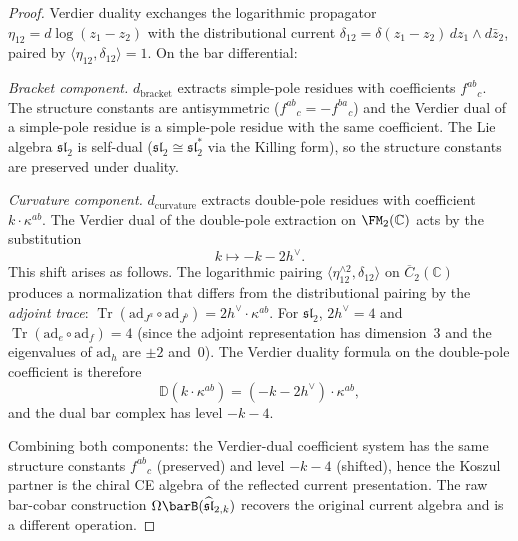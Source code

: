 \begin{proof}
Verdier duality exchanges the logarithmic propagator
$\eta_{12} = d\log(z_1 - z_2)$ with the distributional current
$\delta_{12} = \delta(z_1 - z_2)\, dz_1 \wedge d\bar{z}_2$, paired
by $\langle \eta_{12}, \delta_{12} \rangle = 1$. On the bar
differential:

\emph{Bracket component.}
$d_{\mathrm{bracket}}$ extracts simple-pole residues with
coefficients $f^{ab}{}_c$. The structure constants are antisymmetric
($f^{ab}{}_c = -f^{ba}{}_c$) and the Verdier dual of a simple-pole
residue is a simple-pole residue with the same coefficient. The Lie
algebra $\mathfrak{sl}_2$ is self-dual
($\mathfrak{sl}_2 \cong \mathfrak{sl}_2^*$ via the Killing form),
so the structure constants are preserved under duality.

\emph{Curvature component.}
$d_{\mathrm{curvature}}$ extracts double-pole residues with
coefficient $k \cdot \kappa^{ab}$. The Verdier dual of the
double-pole extraction on $\FM_2(\mathbb{C})$ acts by the
substitution
\[
k \longmapsto -k - 2h^\vee.
\]
This shift arises as follows. The logarithmic pairing
$\langle \eta_{12}^{\wedge 2}, \delta_{12} \rangle$ on
$\overline{C}_2(\mathbb{C})$ produces a normalization that
differs from the distributional pairing by the
\emph{adjoint trace}: $\operatorname{Tr}(\mathrm{ad}_{J^a} \circ \mathrm{ad}_{J^b})
= 2h^\vee \cdot \kappa^{ab}$. For $\mathfrak{sl}_2$,
$2h^\vee = 4$ and $\operatorname{Tr}(\mathrm{ad}_e \circ \mathrm{ad}_f) = 4$
(since the adjoint representation has dimension~$3$ and the
eigenvalues of $\mathrm{ad}_h$ are $\pm 2$ and~$0$). The Verdier
duality formula on the double-pole coefficient is therefore
\[
\mathbb{D}(k \cdot \kappa^{ab})
= (-k - 2h^\vee) \cdot \kappa^{ab},
\]
and the dual bar complex has level $-k - 4$.

Combining both components: the Verdier-dual coefficient system has
the same structure constants $f^{ab}{}_c$ (preserved) and level
$-k - 4$ (shifted), hence the Koszul partner is the chiral CE
algebra of the reflected current presentation. The raw bar-cobar
construction $\Omega\barB(\widehat{\mathfrak{sl}}_{2,k})$ recovers
the original current algebra and is a different operation.
\end{proof}

